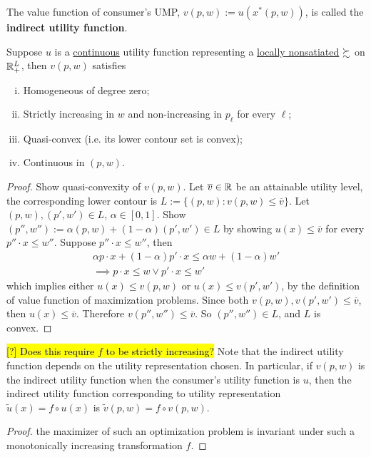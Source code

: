 \documentclass{article}
\begin{document}
 			\begin{definition}
 				The value function of consumer's UMP, $v(p, w) := u(x^*(p, w))$, is called the \textbf{indirect utility function}.
 			\end{definition}
 			
 			\begin{proposition}[3.D.3]
 				Suppose $u$ is a \ul{continuous} utility function representing a \ul{locally nonsatiated} $\succsim$ on $\mathbb{R}^L_+$, then $v(p, w)$ satisfies
 				\begin{enumerate}[(i)]
 					\item Homogeneous of degree zero;
 					\item Strictly increasing in $w$ and non-increasing in $p_\ell$ for every $\ell$;
 					\item Quasi-convex (i.e. its lower contour set is convex);
 					\item Continuous in $(p, w)$.
 				\end{enumerate}
 			\end{proposition}
 			
 			\begin{proof}
 				Show quasi-convexity of $v(p, w)$. Let $\overline{v} \in \mathbb{R}$ be an attainable utility level, the corresponding lower contour is $L :=\{(p, w) : v(p, w) \leq \overline{v}\}$. Let $(p, w), (p', w') \in L$, $\alpha \in [0, 1]$. Show $(p'', w'') := \alpha(p, w) + (1-\alpha)(p', w') \in L$ by showing $u(x) \leq \overline{v}$ for every $p'' \cdot x \leq w''$. Suppose $p'' \cdot x \leq w''$, then
 				\begin{align}
 					\alpha p \cdot x + (1-\alpha) p' \cdot x \leq \alpha w + (1-\alpha)w' \\
 					\implies p \cdot x \leq w \lor p' \cdot x \leq w'
 				\end{align}
 				which implies either $u(x) \leq v(p, w)$ or $u(x) \leq v(p' ,w')$, by the definition of value function of maximization problems. Since both $v(p,w), v(p',w') \leq \overline{v}$, then $u(x) \leq \overline{v}$. Therefore $v(p'', w'') \leq \overline{v}$. So $(p'', w'') \in L$, and $L$ is convex.
 			\end{proof}
 			
 			\begin{proposition}[Transformation on $v$]
 				\hl{[?] Does this require $f$ to be strictly increasing?}
 				Note that the indirect utility function depends on the utility representation chosen. In particular, if $v(p, w)$ is the indirect utility function when the consumer's utility function is $u$, then the indirect utility function corresponding to utility representation $\tilde{u}(x) = f \circ u(x)$ is $\tilde{v}(p, w) = f \circ v(p, w)$. 
 			\end{proposition}
 			
 			\begin{proof}
 				the maximizer of such an optimization problem is invariant under such a monotonically increasing transformation $f$.
 			\end{proof}
\end{document}
